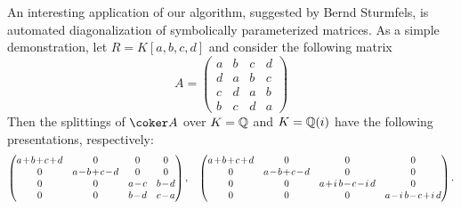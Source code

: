 \documentclass[12pt]{article}
\numberwithin{equation}{section}
\theoremstyle{theorem}
\numberwithin{thm}{section}
\theoremstyle{definition}
\begin{document}
\begin{exa}\label{example:QQ}
  An interesting application of our algorithm, suggested by Bernd Sturmfels,  is automated diagonalization of symbolically parameterized matrices. As a simple demonstration, let $R = K[a,b,c,d]$ and consider the following matrix
  \[ A = \begin{pmatrix}
    a&b&c&d\\
    d&a&b&c\\
    c&d&a&b\\
    b&c&d&a
  \end{pmatrix} \]
  Then the splittings of $\coker A$ over $K = \mathbb Q$ and $K = \mathbb Q(i)$ have the following presentations, respectively:
  \[\medmuskip1.5mu \begin{pmatrix}
    a+b+c+d&0&0&0\\
    0&a-b+c-d&0&0\\
    0&0&a-c&b-d\\
    0&0&b-d&c-a
  \end{pmatrix},
\quad
  \begin{pmatrix}
    a+b+c+d&0&0&0\\
    0&a-b+c-d&0&0\\
    0&0&a+i\,b-c-i\,d&0\\
    0&0&0&a-i\,b-c+i\,d
  \end{pmatrix}.
  \]


\end{exa}





\end{document}
